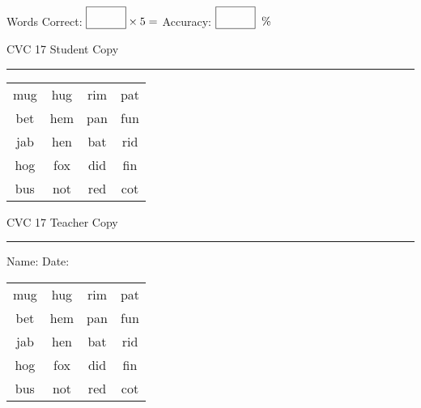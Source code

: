 \documentclass{memoir}
\begin{document}
\normalsize

Words Correct: $\fbox{\phantom{\huge 100}} \times 5 = $ Accuracy: $\fbox{\phantom{\huge 100}}\;\; \%$ 

\vfill

\newpage


\footnotesize \noindent
CVC 17 \hfill Student Copy
\smallskip
\hrule

\huge

\setlength{\tabcolsep}{14pt}
\def\arraystretch{2}

{\selectfont


\begin{vplace}[0.5]
\begin{center}
\begin{tabular}{cccc}
mug & hug & rim & pat \\
bet & hem & pan & fun \\
jab & hen & bat & rid \\
hog & fox & did & fin \\
bus & not & red & cot \\
\end{tabular}
\end{center}
\end{vplace}

}

\newpage

\footnotesize \noindent
CVC 17 \hfill Teacher Copy
\smallskip
\hrule

\normalsize

\vfill

\noindent
Name: \underline{\hspace{1.75in}} \hfill Date: \underline{\hspace{1in}}

\huge

{\selectfont


\begin{vplace}[0.5]
\begin{center}
\begin{tabular}{cccc}
mug & hug & rim & pat \\
bet & hem & pan & fun \\
jab & hen & bat & rid \\
hog & fox & did & fin \\
bus & not & red & cot \\
\end{tabular}
\end{center}
\end{vplace}



}
\end{document}
